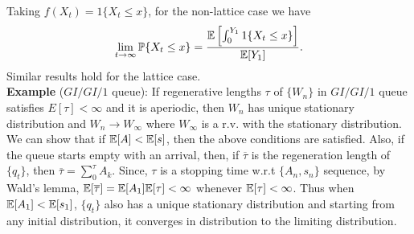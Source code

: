 \documentclass[all-lectures.tex]{subfiles}
\begin{document}
Taking $f(X_t) = 1\{X_t \leq x\}$, for the non-lattice case we have 
\begin{align*}
\lim_{t\to \infty} \mathbb{P}\{X_t \leq x\} = \frac{\mathbb{E}\left[ \int_0^{Y_1} 1\{X_t \leq x\}\right]}{\mathbb{E}[Y_1]}.
\end{align*}
Similar results hold for the lattice case. \\
\indent \textbf{Example} ($GI/GI/1$ queue): If regenerative lengths $\tau$ of $\{W_n\}$ in $GI/GI/1$ queue satisfies $E[\tau] < \infty$ and it is aperiodic, then $W_n$ has unique stationary distribution and $W_n \to W_\infty$ where $W_\infty$ is a r.v. with the stationary distribution. We can show that if $\mathbb{E}[A] < \mathbb{E}[s]$, then the above conditions are satisfied. Also, if the queue starts empty with an arrival, then, if $\overline{\tau}$ is the regeneration length of $\{q_t\}$, then $\overline{\tau} = \sum_0^{\tau} A_k$. Since, $\tau$ is a stopping time w.r.t $\{ A_n, s_n\}$ sequence, by Wald's lemma, $\mathbb{E}[\overline{\tau}]=\mathbb{E}[A_1]\mathbb{E}[\tau] < \infty$ whenever $\mathbb{E}[\tau] < \infty$. Thus when $\mathbb{E}[A_1]<\mathbb{E}[s_1]$, $\{q_t\}$ also has a unique stationary distribution and starting from any initial distribution,  it converges in distribution to the limiting distribution.
\end{document}
